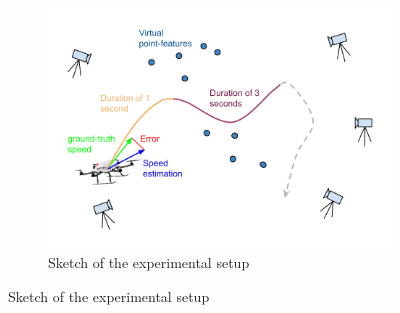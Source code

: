 \documentclass[letterpaper, 10 pt, conference]{ieeeconf}  %
\begin{document}
\begin{figure}
  \centering
  \begin{subfigure}[t]{\columnwidth}
    \includegraphics[width=\textwidth]{images/setupTestDroneError.png}
    \caption{Sketch of the experimental setup}
  \end{subfigure}
  \vspace{0.5cm}


\end{figure}
\end{document}
